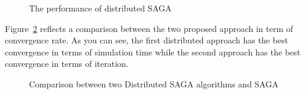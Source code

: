 \documentclass[a4paper,11pt]{article}
\begin{document}
\begin{figure} [h]
	\centering
	 \hspace{0pt}
	 \hspace{0pt}
	\caption{The performance of distributed SAGA }
	\label{3figs}
\end{figure}

Figure~\ref{2figs} reflects a comparison between the two proposed approach in term of convergence rate. As you can see, the first distributed approach has the best convergence in terms of simulation time while the second approach has the best convergence in terms of iteration.
\begin{figure} [h]
	\centering
	 \hspace{0pt}
	\caption{Comparison between two Distributed SAGA algorithms and SAGA}
	\label{2figs}
\end{figure}

\printbibliography
\end{document}

